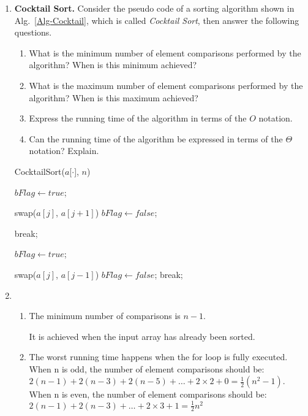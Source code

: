 \documentclass[12pt,a4paper]{article}
\makeatletter
\newtheorem*{solution}{Solution}
\theoremstyle{definition}
\renewenvironment{solution}[1][Solution] {\par\pushQED{\qed}\normalfont\topsep6\p@\@plus6\p@\relax\trivlist\item[\hskip\labelsep\bfseries#1\@addpunct{.}]\ignorespaces}{\popQED\endtrivlist\@endpefalse} \makeatother
\makeatother
\begin{document}
\begin{enumerate}

\item \textbf{Cocktail Sort.} Consider the pseudo code of a sorting algorithm shown in Alg.~\ref{Alg-Cocktail}, which is called \emph{Cocktail Sort}, then answer the following questions.


\begin{minipage}[t]{0.4\textwidth}
\begin{enumerate}
\item What is the minimum number of element comparisons performed by the algorithm? When is this minimum achieved?
\item What is the maximum number of element comparisons performed by the algorithm? When is this maximum achieved?
\item Express the running time of the algorithm in terms of the $O$ notation.
\item Can the running time of the algorithm be expressed in terms of the $\Theta$ notation? Explain.
\end{enumerate}
\end{minipage}
\hspace{2mm}
\begin{minipage}[t]{0.5\textwidth}
\begin{algorithm}[H]
		\caption{CocktailSort($a$[$\cdot$], $n$)} \label{Alg-Cocktail}
		{
			$bFlag \leftarrow true$;
			
			{
				{
					swap($a[j]$, $a[j+1]$)\;
					$bFlag \leftarrow false$;
				}
			}
			
			{
				break;
			}
			
			$bFlag \leftarrow true$;			
			
			{
				{
					swap($a[j]$, $a[j-1]$)\;
					$bFlag \leftarrow false$;
				}
			}
			{
				break;
			}
		}
\end{algorithm}
\end{minipage}

\begin{solution}
\begin{enumerate}
    \item The minimum number of comparisons is $n-1$.
    
    It is achieved when the input array has already been sorted.
    \item The worst running time happens when the for loop is fully executed. When n is odd, the number of element comparisons should be: $2(n-1)+2(n-3)+2(n-5)+\dots+ 2\times 2+0=\frac{1}{2}(n^2-1)$. When n is even, the number of element comparisons should be:$2(n-1)+2(n-3)+\dots+2\times 3+1 = \frac{1}{2}n^2$
    

\end{enumerate}
\end{solution}
\end{enumerate}
\end{document}

